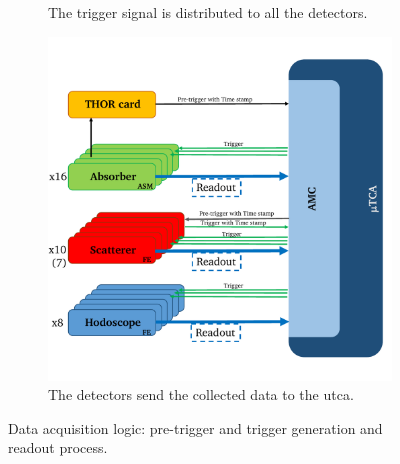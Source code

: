 \begin{figure}
\begin{subfigure}[b]{0.5\textwidth}
\caption[Trigger signal is distributed to all the detectors.]{The trigger signal is distributed to all the detectors.}\label{chapappA::subfig::triggerLogic_5}
\end{subfigure}%
\begin{subfigure}[b]{0.5\textwidth}
 \centering
\includegraphics[width=0.9\linewidth]{03_GraphicFiles/appendixA_dataFormat/triggerLogic_6.pdf}
\caption[The detectors send the collected data to the \gls{utca}.]{The detectors send the collected data to the \gls{utca}.}\label{chapappA::subfig::triggerLogic_6}
\end{subfigure}%
\caption{Data acquisition logic: pre-trigger and trigger generation and readout process.}
\label{chapappA::fig::triggerGeneration}
\end{figure}


